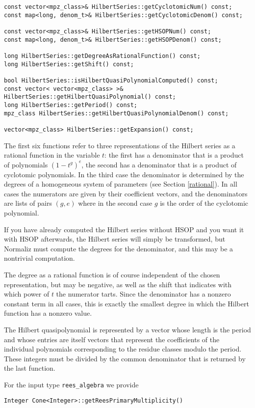 \documentclass[12pt,a4paper]{scrartcl}
\theoremstyle{definition}
\begin{document}
\begin{small}
\begin{Verbatim}
const vector<mpz_class>& HilbertSeries::getCyclotomicNum() const;
const map<long, denom_t>& HilbertSeries::getCyclotomicDenom() const;

const vector<mpz_class>& HilbertSeries::getHSOPNum() const;
const map<long, denom_t>& HilbertSeries::getHSOPDenom() const;

long HilbertSeries::getDegreeAsRationalFunction() const;
long HilbertSeries::getShift() const;

bool HilbertSeries::isHilbertQuasiPolynomialComputed() const;
const vector< vector<mpz_class> >& HilbertSeries::getHilbertQuasiPolynomial() const;
long HilbertSeries::getPeriod() const;
mpz_class HilbertSeries::getHilbertQuasiPolynomialDenom() const;

vector<mpz_class> HilbertSeries::getExpansion() const;
\end{Verbatim}

The first six functions refer to three representations of the Hilbert series as a rational function in the variable $t$: the first has a denominator that is a product of polynomials $(1-t^g)^e$, the second has a denominator that is a product of cyclotomic polynomials. In the third case the denominator is determined by the degrees of a homogeneous system of parameters (see Section \ref{rational}). In all cases the numerators are given by their coefficient vectors, and the denominators are lists of pairs $(g,e)$ where in the second case $g$ is the order of the cyclotomic polynomial.

If you have already computed the Hilbert series without HSOP and you want it with HSOP afterwards, the Hilbert series will simply be transformed, but Normaliz must compute the degrees for the denominator, and this may be a nontrivial computation.

The degree as a rational function is of course independent of the chosen representation, but may be negative, as well as the shift that indicates with which power of $t$ the numerator tarts. Since the denominator has a nonzero constant term in all cases, this is exactly the smallest degree in which the Hilbert function has a nonzero value.

The Hilbert quasipolynomial is represented by a vector whose length is the period and whose entries are itself vectors that represent the coefficients of the individual polynomials corresponding to the residue classes modulo the period. These integers must be divided by the common denominator that is returned by the last function.

For the input type \verb|rees_algebra| we provide
\begin{Verbatim}
Integer Cone<Integer>::getReesPrimaryMultiplicity()
\end{Verbatim}


\end{small}
\end{document}

